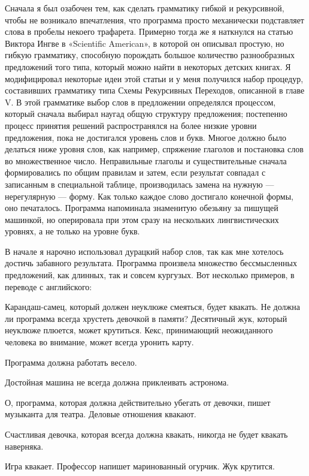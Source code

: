 Сначала я был озабочен тем, как сделать грамматику гибкой и рекурсивной, чтобы не возникало впечатления, что программа просто механически подставляет слова в пробелы некоего трафарета. Примерно тогда же я наткнулся на статью Виктора Ингве в «Scientific American», в которой он описывал простую, но гибкую грамматику, способную порождать большое количество разнообразных предложений того типа, который можно найти в некоторых детских книгах. Я модифицировал некоторые идеи этой статьи и у меня получился набор процедур, составивших грамматику типа Схемы Рекурсивных Переходов, описанной в главе V. В этой грамматике выбор слов в предложении определялся процессом, который сначала выбирал наугад общую структуру предложения; постепенно процесс принятия решений распространялся на более низкие уровни предложения, пока не достигался уровень слов и букв. Многое должно было делаться ниже уровня слов, как например, спряжение глаголов и постановка слов во множественное число. Неправильные глаголы и существительные сначала формировались по общим правилам и затем, если результат совпадал с записанным в специальной таблице, производилась замена на нужную --- нерегулярную --- форму. Как только каждое слово достигало конечной формы, оно печаталось. Программа напоминала знаменитую обезьяну за пишущей машинкой, но оперировала при этом сразу на нескольких лингвистических уровнях, а не только на уровне букв.

В начале я нарочно использовал дурацкий набор слов, так как мне хотелось достичь забавного результата. Программа произвела множество бессмысленных предложений, как длинных, так и совсем кургузых. Вот несколько примеров, в переводе с английского:

Карандаш-самец, который должен неуклюже смеяться, будет квакать. Не должна ли программа всегда хрустеть девочкой в памяти? Десятичный жук, который неуклюже плюется, может крутиться. Кекс, принимающий неожиданного человека во внимание, может всегда уронить карту.

Программа должна работать весело.

Достойная машина не всегда должна приклеивать астронома.

О, программа, которая должна действительно убегать от девочки, пишет музыканта для театра. Деловые отношения квакают.

Счастливая девочка, которая всегда должна квакать, никогда не будет квакать наверняка.

Игра квакает. Профессор напишет маринованный огурчик. Жук крутится.

